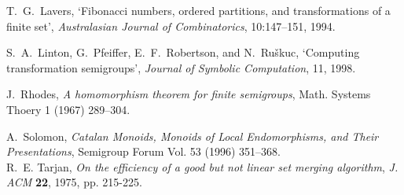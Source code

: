 \documentclass{acmconf}
\begin{document}
\begin{thebibliography}{9}
T.~G.~Lavers,
`Fibonacci numbers, ordered partitions, and transformations of a
finite set', {\em Australasian Journal of Combinatorics},
10:147--151, 1994.

S.~A.~Linton, G.~Pfeiffer, E.~F.~Robertson, and N.~Ru\v{s}kuc,
`Computing transformation semigroups',
{\em Journal of Symbolic Computation}, 11, 1998.

	J.~Rhodes, \emph{A homomorphism theorem for finite semigroups},
	Math. Systems Thoery 1 (1967) 289--304.

A.~Solomon, {\em Catalan Monoids, Monoids of Local Endomorphisms, 
and Their Presentations}, Semigroup Forum Vol. 53 (1996) 351--368. \\

   R.~E. Tarjan, \emph{On the efficiency of a good but not linear
   set merging algorithm}, \emph{J. ACM} {\bf 22}, 1975, pp. 215-225.
\end{thebibliography}
\end{document}

